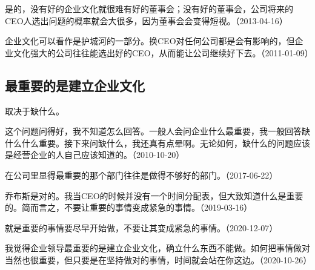 
是的，没有好的企业文化就很难有好的董事会；没有好的董事会，公司将来的CEO人选出问题的概率就会大很多，因为董事会会变得短视。（2013-04-16）


企业文化可以看作是护城河的一部分。换CEO对任何公司都是会有影响的，但企业文化强大的公司往往能选出好的CEO，从而能让公司继续好下去。（2011-01-09）

\subsection{最重要的是建立企业文化}


取决于缺什么。


这个问题问得好，我不知道怎么回答。一般人会问企业什么最重要，我一般回答缺什么什么重要。接下来问缺什么，我还真有点晕啊。无论如何，缺什么的问题应该是经营企业的人自己应该知道的。（2010-10-20）

在公司里显得最重要的那个部门往往是做得不够好的部门。（2017-06-22）


乔布斯是对的。我当CEO的时候并没有一个时间分配表，但大致知道什么是重要的。简而言之，不要让重要的事情变成紧急的事情。（2019-03-16）


就是重要的事情要尽早开始做，不要让其变成紧急的事情。（2020-12-07）


我觉得企业领导最重要的是建立企业文化，确立什么东西不能做。如何把事情做对当然也很重要，但只要是在坚持做对的事情，时间就会站在你这边。（2020-10-26）

